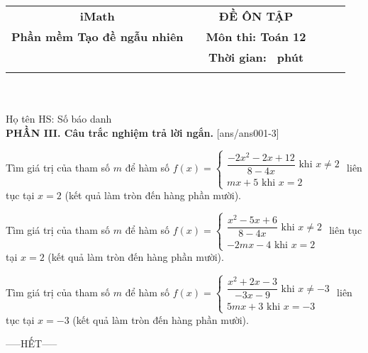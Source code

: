 \documentclass[12pt,a4paper]{article}
\newcommand{\tenso}{iMath}
\newcommand{\tentruong}{Phần mềm Tạo đề ngẫu nhiên}
\newcommand{\tenkythi}{ĐỀ ÔN TẬP}
\newcommand{\tenmonthi}{Môn thi: Toán 12}
\newcommand{\thoigian}{}
\newcommand{\tieude}[1]{
   \begin{tabular}{cm{3cm}cm{3cm}cm{3cm}}
    {\bf \tenso} & & {\bf \tenkythi} \\
    {\bf \tentruong} & & {\bf \tenmonthi}\\
    && {\bf Thời gian: \bf \thoigian \, phút}\\
    && { \fbox{\bf Mã đề: #1}}
   \end{tabular}\\\\
    
   {Họ tên HS: \dotfill Số báo danh \dotfill}\\
}
\newcommand{\chantrang}[2]{\rfoot{Trang \thepage $-$ Mã đề #2}}
\begin{document}


\tieude{001}
\chantrang{\pageref{LastPage}}{001}
\setcounter{page}{1}
{\bf PHẦN III. Câu trắc nghiệm trả lời ngắn.}
\setcounter{ex}{0}
[ans/ans001-3]
\begin{ex}
 Tìm giá trị của tham số ${m}$ để hàm số $f(x)=\left\{ \begin{array}{l} 
    \dfrac{- 2 x^{2} - 2 x + 12}{8 - 4 x} \text{ khi } x\ne 2\\ 
    m x + 5 \text{ khi } x = 2
    \end{array} \right.$ liên tục tại $x=2$ (kết quả làm tròn đến hàng phần mười).



\end{ex}

\begin{ex}
 Tìm giá trị của tham số ${m}$ để hàm số $f(x)=\left\{ \begin{array}{l} 
    \dfrac{x^{2} - 5 x + 6}{8 - 4 x} \text{ khi } x\ne 2\\ 
    - 2 m x - 4 \text{ khi } x = 2
    \end{array} \right.$ liên tục tại $x=2$ (kết quả làm tròn đến hàng phần mười).



\end{ex}

\begin{ex}
 Tìm giá trị của tham số ${m}$ để hàm số $f(x)=\left\{ \begin{array}{l} 
    \dfrac{x^{2} + 2 x - 3}{- 3 x - 9} \text{ khi } x\ne -3\\ 
    5 m x + 3 \text{ khi } x = -3
    \end{array} \right.$ liên tục tại $x=-3$ (kết quả làm tròn đến hàng phần mười).



\end{ex}


 \begin{center}
-----HẾT-----
\end{center}

\newpage 
\end{document}
